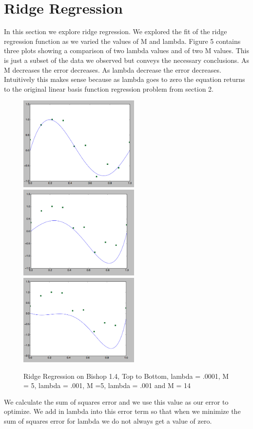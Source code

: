 \documentclass[pageno]{jpaper}
\begin{document}
\section{Ridge Regression}
In this section we explore ridge regression. 
We explored the fit of the ridge regression function as we varied the values of M and lambda. Figure 5 contains three plots showing a comparison of two lambda values and of two M values. This is just a subset of the data we observed but conveys the necessary conclusions. As M decreases the error decreases. As lambda decrease the error decreases. Intuitively this makes sense because as lambda goes to zero the equation returns to the original linear basis function regression problem from section 2. 
\begin{figure}[ht!]
\centering
\includegraphics[width=60mm]{lambda=0001}
\includegraphics[width=60mm]{lambda=001}
\includegraphics[width=60mm]{m=15}
\caption{Ridge Regression on Bishop 1.4, Top to Bottom, lambda = .0001, M = 5, lambda = .001, M =5, lambda = .001 and M = 14}
\label{overflow}
\end{figure}


We calculate the sum of squares error and we use this value as our error to optimize. We add in lambda into this error term so that when we minimize the sum of squares error for lambda we do not always get a value of zero. 
\end{document}

